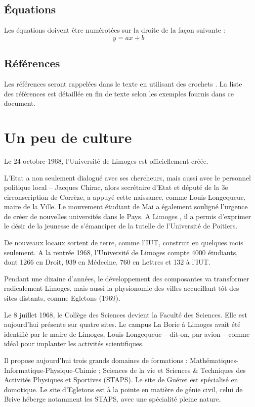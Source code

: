 \documentclass{jnm}
\begin{document}
\subsection{Équations}
Les équations doivent être numérotées sur la droite de la façon suivante :
\begin{equation}
	y=ax+b
\end{equation}

\subsection{Références}
Les références seront rappelées dans le texte en utilisant des crochets \cite{kerherve, deplus}. La liste des références est détaillée en fin de texte selon les exemples fournis dans ce document.



\section{Un peu de culture}
Le 24 octobre 1968, l'Université de Limoges est officiellement créée.

L’Etat a non seulement dialogué avec ses chercheurs, mais aussi avec le personnel politique local – Jacques Chirac, alors secrétaire d’Etat et député de la 3e circonscription de Corrèze, a appuyé cette naissance, comme Louis Longequeue, maire de la Ville. Le mouvement étudiant de Mai a également souligné l’urgence de créer de nouvelles universités dans le Pays. A Limoges  \cite{limoges}, il a permis d’exprimer le désir de la jeunesse de s’émanciper de la tutelle de l’Université de Poitiers.

De nouveaux locaux sortent de terre, comme l’IUT, construit en quelques mois seulement. A la rentrée 1968, l’Université de Limoges compte 4000 étudiants, dont 1266 en Droit, 939 en Médecine, 760 en Lettres et 132 à l’IUT.

Pendant une dizaine d’années, le développement des composantes va transformer radicalement Limoges, mais aussi la physionomie des villes accueillant tôt des sites distants, comme Egletons (1969).

Le 8 juillet 1968, le Collège des Sciences devient la Faculté des Sciences. Elle est aujourd’hui présente sur quatre sites. Le campus La Borie à Limoges avait été identifié par le maire de Limoges, Louis Longequeue – dit-on, par avion – comme idéal pour implanter les activités scientifiques.

Il propose aujourd’hui trois grands domaines de formations : Mathématiques-Informatique-Physique-Chimie ; Sciences de la vie et Sciences \& Techniques des Activités Physiques et Sportives (STAPS). Le site de Guéret est spécialisé en domotique. Le site d’Egletons est à la pointe en matière de génie civil, celui de Brive héberge notamment les STAPS, avec une spécialité pleine nature.
\end{document}
